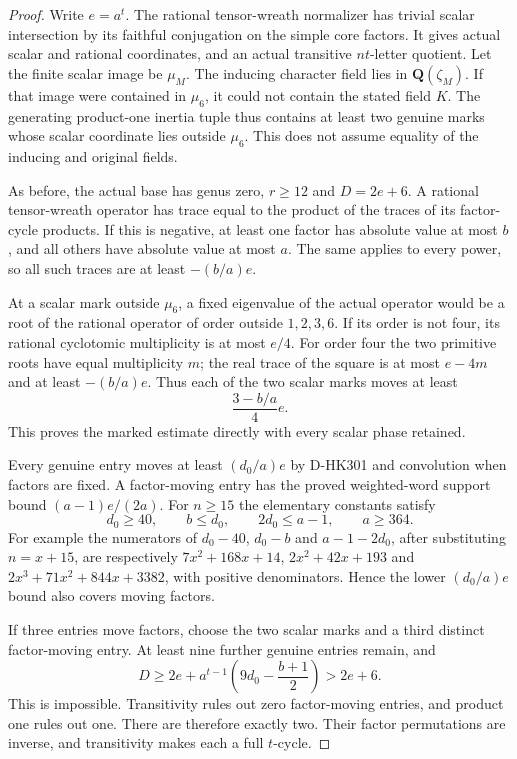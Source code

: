 \begin{proof}
Write $e=a^t$.  The rational tensor-wreath normalizer
has trivial scalar intersection by its faithful conjugation
on the simple core factors.  It gives actual scalar and
rational coordinates, and an actual transitive $nt$-letter
quotient.  Let the finite scalar image be $\mu_M$.
The inducing character field lies in $\mathbf Q(\zeta_M)$.
If that image were contained in $\mu_6$, it could not
contain the stated field $K$.  The generating product-one
inertia tuple thus contains at least two genuine marks
whose scalar coordinate lies outside $\mu_6$.
This does not assume equality of the inducing and original fields.

As before, the actual base has genus zero, $r\ge12$ and
$D=2e+6$.  A rational tensor-wreath operator has trace
equal to the product of the traces of its factor-cycle
products.  If this is negative, at least one factor has
absolute value at most $b$, and all others have absolute
value at most $a$.  The same applies to every power, so
all such traces are at least $-(b/a)e$.

At a scalar mark outside $\mu_6$, a fixed eigenvalue of
the actual operator would be a root of the rational
operator of order outside $1,2,3,6$.  If its order is
not four, its rational cyclotomic multiplicity is at
most $e/4$.  For order four the two primitive roots have
equal multiplicity $m$; the real trace of the square
is at most $e-4m$ and at least $-(b/a)e$.
Thus each of the two scalar marks moves at least
\[
                           \frac{3-b/a}{4}e.
 \tag{HK3.14}
\]
This proves the marked estimate directly with every scalar phase retained.

Every genuine entry moves at least $(d_0/a)e$ by
D-HK301 and convolution when factors are fixed.
A factor-moving entry has the proved weighted-word
support bound $(a-1)e/(2a)$.
For $n\ge15$ the elementary constants satisfy
\[
                  d_0\ge40,\qquad b\le d_0,\qquad
                  2d_0\le a-1,\qquad a\ge364.
 \tag{HK3.15}
\]
For example the numerators of $d_0-40$, $d_0-b$ and
$a-1-2d_0$, after substituting $n=x+15$, are respectively
$7x^2+168x+14$, $2x^2+42x+193$ and
$2x^3+71x^2+844x+3382$, with positive denominators.
Hence the lower $(d_0/a)e$ bound also covers moving factors.

If three entries move factors, choose the two scalar
marks and a third distinct factor-moving entry.
At least nine further genuine entries remain, and
\[
 D\ge2e+a^{t-1}\left(9d_0-\frac{b+1}{2}\right)>2e+6.
 \tag{HK3.16}
\]
This is impossible.  Transitivity rules out zero
factor-moving entries, and product one rules out one.
There are therefore exactly two.  Their factor
permutations are inverse, and transitivity makes each
a full $t$-cycle.


\end{proof}

